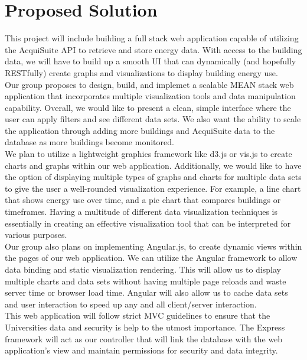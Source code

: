 \documentclass[onecolumn, draftclsnofoot,10pt, compsoc]{IEEEtran}
\begin{document}
  \section{Proposed Solution}
  This project will include building a full stack web application capable of utilizing the AcquiSuite API to retrieve and store energy data. With access to the building data, we will have to build up a smooth UI that can dynamically (and hopefully RESTfully) create graphs and visualizations to display building energy use.\\
  \indent Our group proposes to design, build, and implemet a scalable MEAN stack web application that incorporates multiple visualization tools and data manipulation capability. Overall, we would like to present a clean, simple interface where the user can apply filters and see different data sets. We also want the ability to scale the application through adding more buildings and AcquiSuite data to the database as more buildings become monitored.\\
  \indent We plan to utilize a lightweight graphics framework like d3.js or vis.js to create charts and graphs within our web application. Additionally, we would like to have the option of displaying multiple types of graphs and charts for multiple data sets to give the user a well-rounded visualization experience. For example, a line chart that shows energy use over time, and a pie chart that compares buildings or timeframes. Having a multitude of different data visualization techniques is essentially in creating an effective visualization tool that can be interpreted for various purposes.\\
  \indent Our group also plans on implementing Angular.js, to create dynamic views within the pages of our web application. We can utilize the Angular framework to allow data binding and static visualization rendering. This will allow us to display multiple charts and data sets without having multiple page reloads and waste server time or browser load time. Angular will also allow us to cache data sets and user interaction to speed up any and all client/server interaction.\\
  \indent This web application will follow strict MVC guidelines to ensure that the Universities data and security is help to the utmost importance. The Express framework will act as our controller that will link the database with the web application's view and maintain permissions for security and data integrity.
\end{document}
